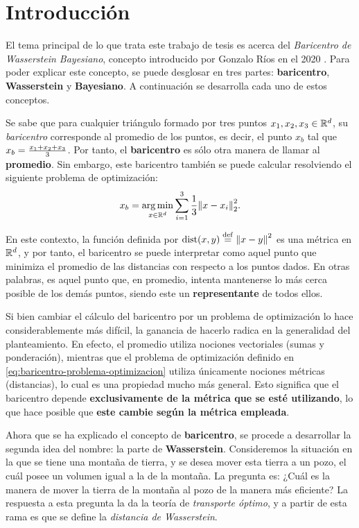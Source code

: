 \chapter{Introducción}

El tema principal de lo que trata este trabajo de tesis es acerca del \emph{Baricentro de Wasserstein Bayesiano}, concepto introducido por Gonzalo Ríos en el 2020 \cite{rios2020contributions}. Para poder explicar este concepto, se puede desglosar en tres partes: \textbf{baricentro}, \textbf{Wasserstein} y \textbf{Bayesiano}. A continuación se desarrolla cada uno de estos conceptos.

Se sabe que para cualquier triángulo formado por tres puntos $x_1, x_2, x_3 \in \mathbb{R}^d$, su \emph{baricentro} corresponde al promedio de los puntos, es decir, el punto $x_b$ tal que $x_b =\nolinebreak \frac{x_1 + x_2 + x_3}{3}$. Por tanto, el \textbf{baricentro} es sólo otra manera de llamar al \textbf{promedio}. Sin embargo, este baricentro también se puede calcular resolviendo el siguiente problema de optimización:
\begin{equation}\label{eq:baricentro-problema-optimizacion}
	x_b = \operatorname*{arg\,m{i}n}_{x \in \mathbb{R}^d} \sum_{i=1}^3 \frac{1}{3} \norm{x - x_i}_2^2.
\end{equation}

En este contexto, la función definida por $\operatorname{dist}(x, y) \stackrel{\mathrm{def}}{=} \norm{x - y}^2$ es una métrica en $\mathbb{R}^d$, y por tanto, el baricentro se puede interpretar como aquel punto que minimiza el promedio de las distancias con respecto a los puntos dados. En otras palabras, es aquel punto que, en promedio, intenta mantenerse lo más cerca posible de los demás puntos, siendo este un \textbf{representante} de todos ellos.

Si bien cambiar el cálculo del baricentro por un problema de optimización lo hace considerablemente más difícil, la ganancia de hacerlo radica en la generalidad del planteamiento. En efecto, el promedio utiliza nociones vectoriales (sumas y ponderación), mientras que el problema de optimización definido en \eqref{eq:baricentro-problema-optimizacion} utiliza únicamente nociones métricas (distancias), lo cual es una propiedad mucho más general. Esto significa que el baricentro depende \textbf{exclusivamente de la métrica que se esté utilizando}, lo que hace posible que \textbf{este cambie según la métrica empleada}.

Ahora que se ha explicado el concepto de \textbf{baricentro}, se procede a desarrollar la segunda idea del nombre: la parte de \textbf{Wasserstein}. Consideremos la situación en la que se tiene una montaña de tierra, y se desea mover esta tierra a un pozo, el cuál posee un volumen igual a la de la montaña. La pregunta es: ¿Cuál es la manera de mover la tierra de la montaña al pozo de la manera más eficiente? La respuesta a esta pregunta la da la teoría de \emph{transporte óptimo}, y a partir de esta rama es que se define la \emph{distancia de Wasserstein}.

